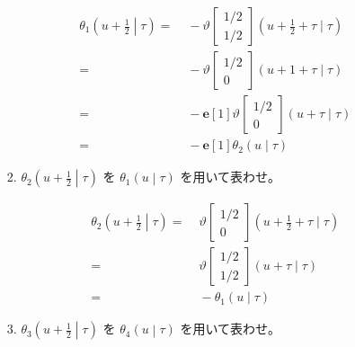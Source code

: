 \documentclass[12pt,b5paper]{ltjsarticle}
\begin{document}
\begin{enumerate}
\begin{enumerate}
\begin{enumerate}
                    \begin{align}
                     \theta_{1} \left(u+\frac{1}{2} \middle| \tau \right)
                      =&\; -\vartheta \begin{bmatrix} 1/2 \\ 1/2 \end{bmatrix} (u+\frac{1}{2}+\tau \mid \tau)\\
                      =&\; -\vartheta \begin{bmatrix} 1/2 \\ 0 \end{bmatrix} (u+1+\tau \mid \tau)\\
                      =&\; - \mathbf{e}[1] \vartheta \begin{bmatrix} 1/2 \\ 0 \end{bmatrix} (u+\tau \mid \tau)\\
                     =&\; -\mathbf{e}[1]\theta_{2}(u\mid\tau)
                    \end{align}

                    \hrulefill


              \item $\displaystyle \theta_{2} \left(u+\frac{1}{2} \middle| \tau \right)$
                    を
                    $\displaystyle \theta_{1} \left(u \middle| \tau \right)$
                    を用いて表わせ。

                    \dotfill

                    \begin{align}
                     \theta_{2} \left(u+\frac{1}{2} \middle| \tau \right)
                      =&\; \vartheta \begin{bmatrix} 1/2 \\ 0 \end{bmatrix} (u+\frac{1}{2}+\tau \mid \tau)\\
                      =&\; \vartheta \begin{bmatrix} 1/2 \\ 1/2 \end{bmatrix} (u+\tau \mid \tau)\\
                     =&\; -\theta_{1}(u\mid\tau)
                    \end{align}

                    \hrulefill


              \item $\displaystyle \theta_{3} \left(u+\frac{1}{2} \middle| \tau \right)$
                    を
                    $\displaystyle \theta_{4} \left(u \middle| \tau \right)$
                    を用いて表わせ。


\end{enumerate}
\end{enumerate}
\end{enumerate}
\end{document}
